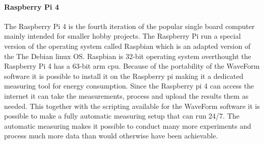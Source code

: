 \paragraph*{Raspberry Pi 4}
The Raspberry Pi 4 is the fourth iteration of the popular single board computer mainly intended for smaller hobby projects. The Raspberry Pi run a special version of the operating system called Raspbian which is an adapted version of the The Debian linux OS. Raspbian is 32-bit operating system overthought the Raspberry Pi 4 has a 63-bit arm cpu. Because of the portability of the WaveForm software it is possible to install it on the Raspberry pi making it a dedicated measuring tool for energy consumption. Since the Raspberry pi 4 can access the internet it can take the measurements, process and  upload the results them as needed. This together with the scripting available for the WaveForm software it is possible to make a fully automatic measuring setup that can run 24/7. The automatic measuring makes it possible to conduct many more experiments and process much more data than would otherwise have been achievable.